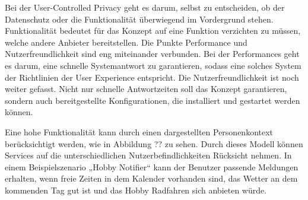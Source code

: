 Bei der User-Controlled Privacy geht es darum, selbst zu entscheiden, ob der Datenschutz oder die Funktionalität überwiegend im Vordergrund stehen. Funktionalität bedeutet für das Konzept auf eine Funktion verzichten zu müssen, welche andere Anbieter bereitstellen. Die Punkte Performance und Nutzerfreundlichkeit sind eng miteinander verbunden. Bei der Performances geht es darum, eine schnelle Systemantwort zu garantieren, sodass eine solches System der Richtlinien der User Experience entspricht. Die Nutzerfreundlichkeit ist noch weiter gefasst. Nicht nur schnelle Antwortzeiten soll das Konzept garantieren, sondern auch bereitgestellte Konfigurationen, die installiert und gestartet werden können. 

Eine hohe Funktionalität kann durch einen dargestellten Personenkontext berücksichtigt werden, wie in Abbildung ?? zu sehen. Durch dieses Modell können Services auf die unterschiedlichen Nutzerbefindlichkeiten Rücksicht nehmen. In einem Beispielszenario „Hobby Notifier“ kann der Benutzer passende Meldungen erhalten, wenn freie Zeiten in dem Kalender vorhanden sind, das Wetter an dem kommenden Tag gut ist und das Hobby Radfahren sich anbieten würde.



